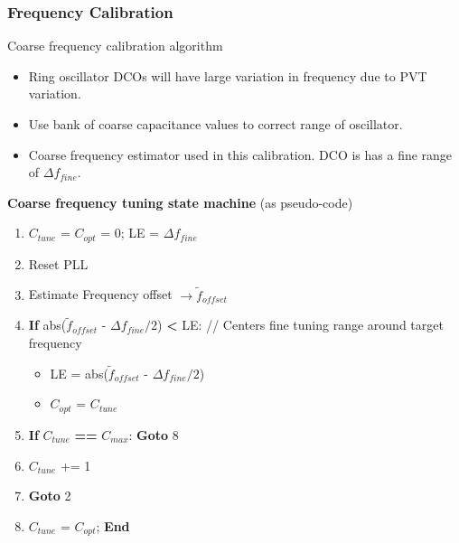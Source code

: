 \documentclass[t, screen, aspectratio=43]{beamer}
\begin{document}
\begin{frame}
	\frametitle{Frequency Calibration}
	\begin{block}{Coarse frequency calibration algorithm}
		\begin{itemize}
			\vspace{-0.25em}
			\scriptsize
			\item Ring oscillator DCOs will have large variation in frequency due to PVT variation.
			\item Use bank of coarse capacitance values to correct range of oscillator.
			\item Coarse frequency estimator used in this calibration.  DCO is has a fine range of $\Delta f_{fine}$.
		\end{itemize} 	
		\vspace{-0.25em}
		\scriptsize
		\textbf{Coarse frequency tuning state machine} (as pseudo-code)
			\begin{enumerate}
				\scriptsize
				\item $C_{tune}$ = $C_{opt}$ = 0;\hspace{1em} LE = $\Delta f_{fine}$		
				\item Reset PLL
				\item Estimate Frequency offset $\rightarrow \tilde f_{offset}$
				\vspace{-0.2em}
				\item \textbf{If} abs($\tilde f_{offset}$ - $\Delta f_{fine}/2$)  \textbf{<} LE: \hspace{1em}\color{teal} // Centers fine tuning range around target frequency
				\color{black}
				\begin{itemize}
					\scriptsize
					\item LE = abs($\tilde f_{offset}$ - $\Delta f_{fine}/2$)
					\item $C_{opt}$ = $C_{tune}$
				\end{itemize}	
				\item \textbf{If} $C_{tune}$ \textbf{==} $C_{max}$: \textbf{Goto} 8		
				\item $C_{tune}$ += 1
				\item \textbf{Goto} 2
				\item $C_{tune}$ = $C_{opt}$; \textbf{End}
			\end{enumerate}
 
	\end{block}
\end{frame}


\end{document}
